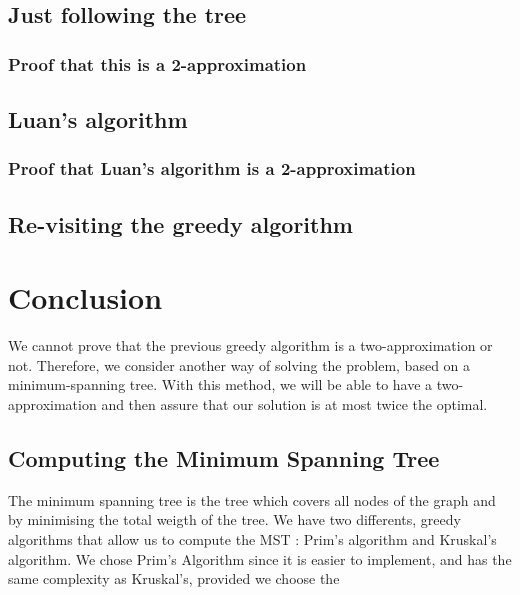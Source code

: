 \documentclass[11pt]{article}
\begin{document}
\subsection{Just following the tree}
\subsubsection{Proof that this is a 2-approximation}

\subsection{Luan's algorithm}

\subsubsection{Proof that Luan's algorithm is a 2-approximation}


\subsection{Re-visiting the greedy algorithm}



\section{Conclusion}


We cannot prove that the previous greedy algorithm is a two-approximation or not. Therefore, we consider another way of solving the problem, based on a minimum-spanning tree. With this method, we will be able to have a two-approximation and then assure that our solution is at most twice the optimal.

\subsection{Computing the Minimum Spanning Tree}

The minimum spanning tree is the tree which covers all nodes of the graph and by minimising the total weigth of the tree.
We have two differents, greedy algorithms that allow us to compute the MST : Prim's algorithm and Kruskal's algorithm. We chose Prim's Algorithm since it is easier to implement, and has the same complexity as Kruskal's, provided we choose the
\end{document}

